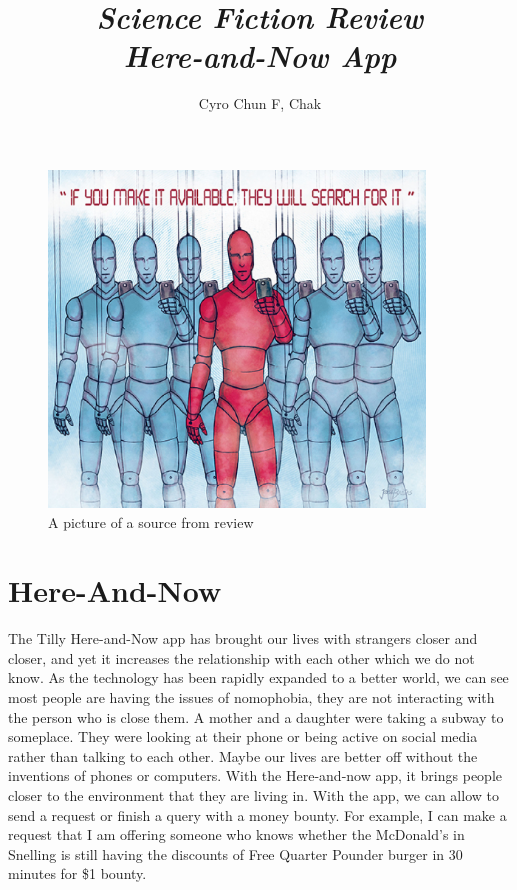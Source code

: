 \documentclass[12pt]{article}
\begin{document}
\title{\emph{Science Fiction Review }\\
	\emph{Here-and-Now App}}
\author{Cyro Chun F, Chak}
\maketitle
\begin{figure}
\caption{ A picture of a source from review}
	\begin{center}
	\includegraphics[scale = 0.5, width = 10cm]{here-and-now.eps}
	\end{center}
		
	
\end{figure}
\section{Here-And-Now}
The Tilly Here-and-Now app has brought our lives with strangers closer and closer, and yet it increases the relationship with each other which we do not know. As the technology has been rapidly expanded to a better world, we can see most people are having the issues of nomophobia, they are not interacting with the person who is close them. A mother and a daughter were taking a subway to someplace. They were looking at their phone or being active on social media rather than talking to each other. Maybe our lives are better off without the inventions of phones or computers. With the Here-and-now app, it brings people closer to the environment that they are living in. With the app, we can allow to send a request or finish a query with a money bounty. For example, I can make a request that I am offering someone who knows whether the McDonald's in Snelling is still having the discounts of Free Quarter Pounder burger in 30 minutes for \$1 bounty.
\end{document}
